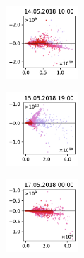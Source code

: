 \begin{figure}[H]
    \centering
    \begin{subfigure}
        \centering
        \includegraphics[width=0.30\textwidth,valign=t]{evaluation/figures/perturbations/perturbation-14.05.2018:10.00-anthropogenic-mul-1.01.pdf}
    \end{subfigure}
    \begin{subfigure}
        \centering
        \includegraphics[width=0.30\textwidth,valign=t]{evaluation/figures/perturbations/perturbation-15.05.2018:19.00-anthropogenic-mul-1.01.pdf}
    \end{subfigure}
    \begin{subfigure}
        \centering
        \includegraphics[width=0.30\textwidth,valign=t]{evaluation/figures/perturbations/perturbation-17.05.2018:00.00-anthropogenic-mul-1.01.pdf}
    \end{subfigure}


\end{figure}
